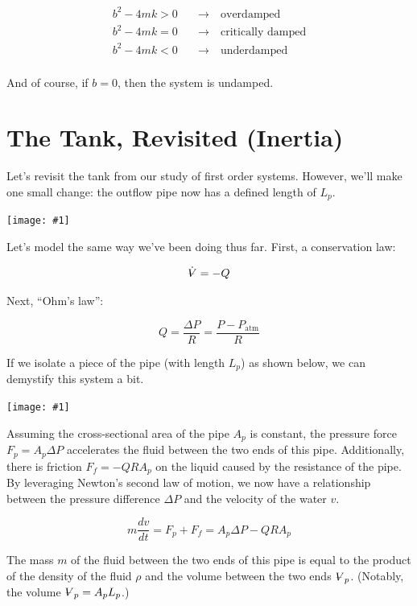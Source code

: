 \documentclass{report}
\newcommand{\Volume}{{\ooalign{\hfil$V$\hfil\cr\kern0.08em--\hfil\cr}}}
\newcommand{\bicture}[1]{
\begin{center}
    {\texttt{[image: \#1]}}
\end{center}}
\begin{document}
\begin{onehalfspacing}
\begin{flushleft}
\begin{align*}
    b^2 - 4mk > 0 \quad &\to \quad \text{overdamped} \\
    b^2 - 4mk = 0 \quad &\to \quad \text{critically damped} \\
    b^2 - 4mk < 0 \quad &\to \quad \text{underdamped} \\
\end{align*}

\vspace{-0.35in}

And of course, if \(b=0\), then the system is undamped. 

\section{The Tank, Revisited (Inertia)}

Let's revisit the tank from our study of first order systems. However, we'll make one small change: the outflow pipe now has a defined length of \(L_p\). 

\bicture{6_inert}

Let's model the same way we've been doing thus far. First, a conservation law:

\vspace{-0.1in}
\[\dot{\Volume} = -Q\]

Next, ``Ohm's law'':

\vspace{-0.1in}
\[Q = \frac{\Delta P}{R} = \frac{P - P_\text{atm}}{R}\]

If we isolate a piece of the pipe (with length \(L_p\)) as shown below, we can demystify this system a bit.

\bicture{6_pipe}

Assuming the cross-sectional area of the pipe \(A_p\) is constant, the pressure force \(F_p = A_p \Delta P\) accelerates the fluid between the two ends of this pipe. Additionally, there is friction \(F_f = -QRA_p\) on the liquid caused by the resistance of the pipe. By leveraging Newton's second law of motion, we now have a relationship between the pressure difference \(\Delta P\) and the velocity of the water \(v\).

\vspace{-0.1in}
\[m \frac{dv}{dt} = F_p + F_f = A_p \Delta P - Q R A_p\]

The mass \(m\) of the fluid between the two ends of this pipe is equal to the product of the density of the fluid \(\rho\) and the volume between the two ends \(\Volume_p\). (Notably, the volume \(\Volume_p = A_p L_p\).)


\end{flushleft}
\end{onehalfspacing}
\end{document}
